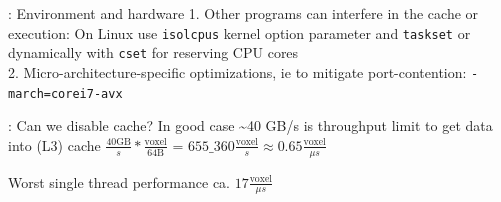 \documentclass{beamer}
\begin{document}
\begin{frame}{\insertsection : Environment and hardware}
  1. Other programs can interfere in the cache or execution: On Linux use \texttt{isolcpus} kernel option parameter and \texttt{taskset} or dynamically with \texttt{cset} for reserving CPU cores\\
  2. Micro-architecture-specific optimizations, ie to mitigate port-contention: \texttt{-march=corei7-avx}\\
\end{frame}
\begin{frame}{\insertsection : Can we disable cache?}
  In good case \textasciitilde 40 GB/s is throughput limit to get data into (L3) cache
  $\frac{40\text{GB}}{s}*\frac{\text{voxel}}{64\text{B}}$ = $655\_360 \frac{\text{voxel}}{s} \approx 0.65\frac{\text{voxel}}{\mu s}$\par
  Worst single thread performance ca. $17 \frac{\text{voxel}}{\mu s}$
\end{frame}

%  
\end{document}
